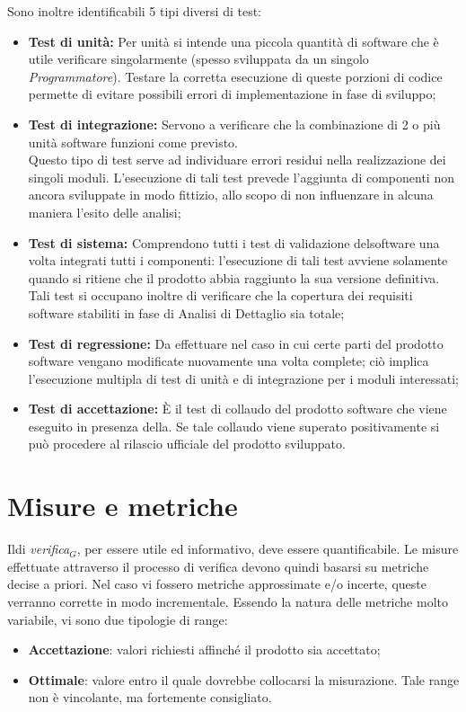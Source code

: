 \begin{itemize}
Sono inoltre identificabili 5 tipi diversi di test:
\begin{itemize}
	\item \textbf{Test di unità:} Per unità si intende una piccola quantità di software che è utile verificare singolarmente (spesso sviluppata da un singolo \textit{Programmatore}).
	Testare la corretta esecuzione di queste porzioni di codice permette di evitare possibili errori di implementazione in fase di sviluppo; 
	\item \textbf{Test di integrazione:} Servono a verificare che la combinazione di 2 o più unità
	software funzioni come previsto. \\
	Questo tipo di test serve ad individuare errori residui nella realizzazione dei singoli
	moduli.
	L'esecuzione di tali test prevede l'aggiunta di componenti non ancora sviluppate in modo fittizio, allo scopo di non influenzare in alcuna maniera l'esito delle analisi;
	\item \textbf{Test di sistema:} Comprendono tutti i test di validazione delsoftware una volta integrati tutti i componenti: l'esecuzione 
	di tali test avviene solamente quando si ritiene che il prodotto abbia raggiunto la sua versione definitiva.\\
	Tali test si occupano inoltre di verificare che la copertura dei requisiti software stabiliti in fase di Analisi
	di Dettaglio sia totale;
	\item \textbf{Test di regressione:} Da effettuare nel caso in cui certe parti del prodotto software vengano modificate nuovamente una volta complete; ciò implica l'esecuzione multipla di test di unità e di integrazione per i moduli interessati;
	\item \textbf{Test di accettazione:} È il test di collaudo del prodotto software che viene eseguito in presenza della.
	Se tale collaudo viene superato positivamente si può procedere al rilascio ufficiale del prodotto sviluppato.
\end{itemize}
	
\end{itemize}	
\chapter{Misure e metriche}\label{Metriche}
Ildi \textit{verifica$_{G}$}, per essere utile ed informativo, deve essere quantificabile. Le misure effettuate attraverso il processo di verifica devono quindi basarsi su metriche decise a priori.
Nel caso vi fossero metriche approssimate e/o incerte, queste verranno corrette in modo incrementale.
Essendo la natura delle metriche molto variabile, vi sono due tipologie di range:
\begin{itemize}
	\item \textbf{Accettazione}: valori richiesti affinché  il prodotto sia accettato;
	\item \textbf{Ottimale}: valore entro il quale dovrebbe collocarsi la misurazione. Tale range non è vincolante, ma fortemente consigliato.
\end{itemize}
